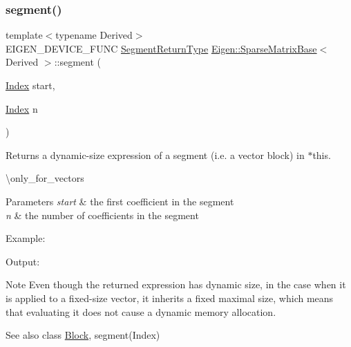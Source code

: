 \subsubsection{\texorpdfstring{segment()}{segment()}\hspace{0.1cm}{\footnotesize\ttfamily [1/2]}}
{\footnotesize\ttfamily template$<$typename Derived$>$ \\
E\+I\+G\+E\+N\+\_\+\+D\+E\+V\+I\+C\+E\+\_\+\+F\+U\+NC \mbox{\hyperlink{class_eigen_1_1_vector_block}{Segment\+Return\+Type}} \mbox{\hyperlink{class_eigen_1_1_sparse_matrix_base}{Eigen\+::\+Sparse\+Matrix\+Base}}$<$ Derived $>$\+::segment (\begin{DoxyParamCaption}\item[{\mbox{\hyperlink{struct_eigen_1_1_eigen_base_a554f30542cc2316add4b1ea0a492ff02}{Index}}}]{start,  }\item[{\mbox{\hyperlink{struct_eigen_1_1_eigen_base_a554f30542cc2316add4b1ea0a492ff02}{Index}}}]{n }\end{DoxyParamCaption})\hspace{0.3cm}{\ttfamily [inline]}}

\begin{DoxyReturn}{Returns}
a dynamic-\/size expression of a segment (i.\+e. a vector block) in $\ast$this.
\end{DoxyReturn}
\textbackslash{}only\+\_\+for\+\_\+vectors


\begin{DoxyParams}{Parameters}
{\em start} & the first coefficient in the segment \\
\hline
{\em n} & the number of coefficients in the segment\\
\hline
\end{DoxyParams}
Example\+: 
\begin{DoxyCodeInclude}{0}
\end{DoxyCodeInclude}
 Output\+: 
\begin{DoxyVerbInclude}
\end{DoxyVerbInclude}


\begin{DoxyNote}{Note}
Even though the returned expression has dynamic size, in the case when it is applied to a fixed-\/size vector, it inherits a fixed maximal size, which means that evaluating it does not cause a dynamic memory allocation.
\end{DoxyNote}
\begin{DoxySeeAlso}{See also}
class \mbox{\hyperlink{class_eigen_1_1_block}{Block}}, segment(\+Index) 
\end{DoxySeeAlso}
\mbox{\label{class_eigen_1_1_sparse_matrix_base_a1d27cc814e81dfab65901aa201a886ef}} 
